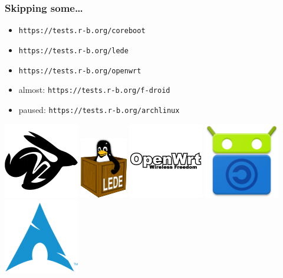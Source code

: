 \documentclass[14pt,aspectratio=169]{beamer}
\begin{document}
\begin{frame}
 \frametitle{Skipping some…}
 \begin{itemize}
  \item \texttt{https://tests.r-b.org/coreboot}
  \item \texttt{https://tests.r-b.org/lede}
  \item \texttt{https://tests.r-b.org/openwrt}
  \item almost: \texttt{https://tests.r-b.org/f-droid}
  \item paused: \texttt{https://tests.r-b.org/archlinux}
 \end{itemize}
 \begin{center}
  \includegraphics[height=0.13\paperheight]{images/coreboot.png}
  \hspace{0.05\paperwidth}
  \includegraphics[height=0.15\paperheight]{images/lede.png}
  \hspace{0.05\paperwidth}
  \includegraphics[height=0.3\paperheight]{images/openwrt.png}
  \hspace{0.05\paperwidth}
  \includegraphics[height=0.13\paperheight]{images/f-droid.png}
  \hspace{0.05\paperwidth}
  \includegraphics[height=0.13\paperheight]{images/archlinux.png}
\end{center}
\end{frame}
\end{document}
